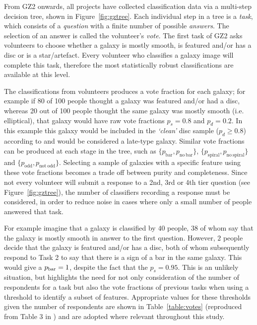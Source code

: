 From GZ2 onwards, all projects have collected classification data via a multi-step decision tree, shown in Figure~\ref{fig:gztree}.  Each individual step in a tree is a \emph{task}, which consists of a \emph{question} with a finite number of possible \emph{answers}. The selection of an answer is called the volunteer's \emph{vote}. The first task of GZ2 asks volunteers to choose whether a galaxy is mostly smooth, is featured and/or has a disc or is a star/artefact. Every volunteer who classifies a galaxy image will complete this task, therefore the most statistically robust classifications are available at this level.


The classifications from volunteers produces a vote fraction for each galaxy; for example if 80 of 100 people thought a galaxy was featured and/or had a disc, whereas 20 out of 100 people thought the same galaxy was mostly smooth (i.e. elliptical), that galaxy would have raw vote fractions $p_{s} = 0.8$ and $p_{d} = 0.2$. In this example this galaxy would be included in the \emph{`clean'} disc sample ($p_d \geq 0.8$) according to \cite{GZ2} and would be considered a late-type galaxy. Similar vote fractions can be produced at each stage in the tree, such as $\{p_{\mathrm{bar}}, p_{\mathrm{no~bar}}\}$, $\{p_{\mathrm{spiral}}, p_{\mathrm{no~spiral}}\}$ and $\{p_{\mathrm{odd}}, p_{\mathrm{not~odd}}\}$. Selecting a sample of galaxies with a specific feature using these vote fractions becomes a trade off between purity and completeness. Since not every volunteer will submit a response to a 2nd, 3rd or 4th tier question (see Figure~\ref{fig:gztree}), the number of classifiers recording a response must be considered, in order to reduce noise in cases where only a small number of people answered that task. 

For example imagine that a galaxy is classified by $40$ people, $38$ of whom say that the galaxy is mostly smooth in answer to the first question. However, $2$ people decide that the galaxy is featured and/or has a disc, both of whom subsequently respond to Task 2 to say that there is a sign of a bar in the same galaxy. This would give a $p_{\rm{bar}}=1$, despite the fact that the $p_s = 0.95$. This is an unlikely situation, but highlights the need for not only consideration of the number of respondents for a task but also the vote fractions of previous tasks when using a threshold to identify a subset of features. Appropriate values for these thresholds given the number of respondents are shown in Table~\ref{table:votes} (reproduced from Table 3 in \citealt{GZ2}) and are adopted where relevant throughout this study. 

